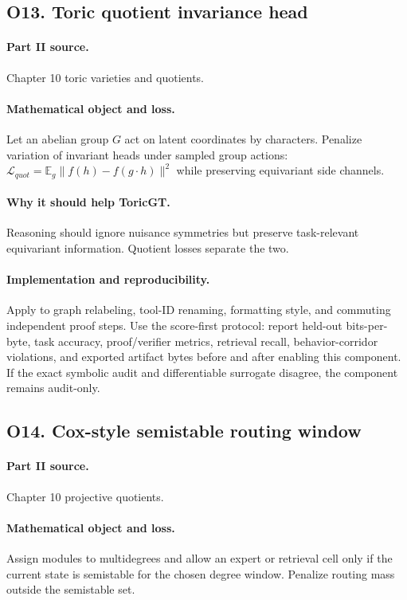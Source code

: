 \documentclass[11pt]{article}
\theoremstyle{definition}
\newcommand{\E}{\mathbb{E}}
\begin{document}
\subsection{O13. Toric quotient invariance head}
\paragraph{Part II source.} Chapter 10 toric varieties and quotients.
\paragraph{Mathematical object and loss.} Let an abelian group $G$ act on latent coordinates by characters.  Penalize variation of invariant heads under sampled group actions: $\mathcal L_{quot}=\E_g\|f(h)-f(g\cdot h)\|^2$ while preserving equivariant side channels.
\paragraph{Why it should help ToricGT.} Reasoning should ignore nuisance symmetries but preserve task-relevant equivariant information.  Quotient losses separate the two.
\paragraph{Implementation and reproducibility.} Apply to graph relabeling, tool-ID renaming, formatting style, and commuting independent proof steps.  Use the score-first protocol: report held-out bits-per-byte, task accuracy, proof/verifier metrics, retrieval recall, behavior-corridor violations, and exported artifact bytes before and after enabling this component.  If the exact symbolic audit and differentiable surrogate disagree, the component remains audit-only.


\subsection{O14. Cox-style semistable routing window}
\paragraph{Part II source.} Chapter 10 projective quotients.
\paragraph{Mathematical object and loss.} Assign modules to multidegrees and allow an expert or retrieval cell only if the current state is semistable for the chosen degree window.  Penalize routing mass outside the semistable set.
\end{document}
